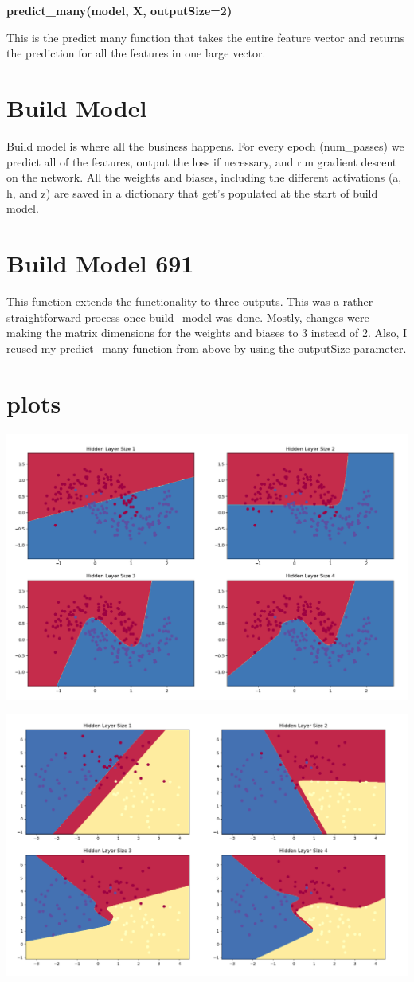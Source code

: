 \documentclass{article}
\begin{document}
\textbf{predict\_many(model, X, outputSize=2)} 

This is the predict many function that takes the entire feature vector and returns the prediction for all the features in one large vector. 

\section*{Build Model} 

Build model is where all the business happens. For every epoch (num\_passes) we predict all of the features, output the loss if necessary, and run gradient descent on the network. All the weights and biases, including the different activations (a, h, and z) are saved in a dictionary that get's populated at the start of build model. 

\section*{Build Model 691}

This function extends the functionality to three outputs. This was a rather straightforward process once build\_model was done. Mostly, changes were making the matrix dimensions for the weights and biases to 3 instead of 2. Also, I reused my predict\_many function from above by using the outputSize parameter. 

\section*{plots} 

\includegraphics[width=\textwidth]{nn.png}

\includegraphics[width=\textwidth]{nn-2.png}
\end{document}
